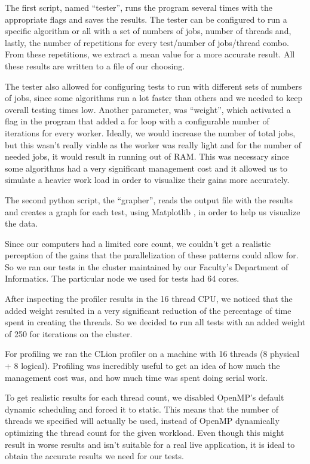 \documentclass[9pt,journal]{IEEEtran}
\begin{document}
The first script, named “tester”, runs the program several times with the appropriate flags and saves the results. The tester can be configured to run a specific algorithm or all with a set of numbers of jobs, number of threads and, lastly, the number of repetitions for every test/number of jobs/thread combo. From these repetitions, we extract a mean value for a more accurate result. All these results are written to a file of our choosing.

The tester also allowed for configuring tests to run with different sets of numbers of jobs, since some algorithms run a lot faster than others and we needed to keep overall testing times low.  Another parameter, was “weight”, which activated a flag in the program that added a for loop with a configurable number of iterations for every worker. Ideally, we would increase the number of total jobs, but this wasn't really viable as the worker was really light and for the number of needed jobs, it would result in running out of RAM. This was necessary since some algorithms had a very significant management cost and it allowed us to simulate a heavier work load in order to visualize their gains more accurately. 

The second python script, the “grapher”, reads the output file with the results and creates a graph for each test, using Matplotlib \cite{matplotlib}, in order to help us visualize the data. 

Since our computers had a limited core count, we couldn’t get a realistic perception of the gains that the parallelization of these patterns could allow for. So we ran our tests in the cluster maintained by our Faculty’s Department of Informatics. The particular node we used for tests had 64 cores.

After inspecting the profiler results in the 16 thread CPU, we noticed that the added weight resulted in a very significant reduction of the percentage of time spent in creating the threads. So we decided to run all tests with an added weight of 250 for iterations on the cluster.

For profiling we ran the CLion profiler on a machine with 16 threads (8 physical + 8 logical). Profiling was incredibly useful to get an idea of how much the management cost was, and how much time was spent doing serial work.

To get realistic results for each thread count, we disabled OpenMP's default dynamic scheduling and forced it to static. This means that the number of threads we specified will actually be used, instead of OpenMP dynamically optimizing the thread count for the given workload. Even though this might result in worse results and isn't suitable for a real live application, it is ideal to obtain the accurate results we need for our tests.
\end{document}
